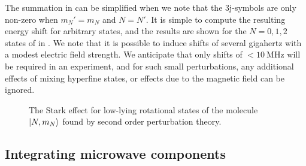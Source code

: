 The summation in  can be simplified when we note that the 3j-symbols
are only non-zero when $m_N' = m_N$ and $N=N'$. It
is simple to compute the resulting energy shift for arbitrary states, and the
results are shown for the $N=0, 1, 2$ states of \CaF{} in . We
note that it is possible to induce shifts
of several gigahertz with a modest electric field strength. We anticipate that
only shifts of $<\SI{10}{\mega\hertz}$ will be required in an
experiment, and for such small perturbations, any additional effects of mixing
hyperfine states, or effects due to the magnetic field can be ignored.

\begin{figure}[h]
  \centering
  \caption{The Stark effect for low-lying rotational states of the \CaF{} molecule $\ket{N,
    m_N}$ found by second order perturbation theory.}
  \label{mws:fig:stark}
\end{figure}

\subsection{Integrating microwave components}


